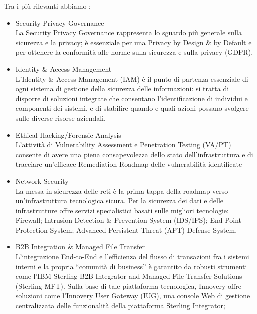 Tra i più rilevanti abbiamo : \begin{itemize}
    \item Security Privacy Governance \\ 
La Security Privacy Governance rappresenta lo sguardo più generale sulla sicurezza e la
privacy; è essenziale per una Privacy by Design \& by Default e per ottenere la conformità
alle norme sulla sicurezza e sulla privacy (GDPR).
    
    \item Identity \& Access Management \\ 
L’Identity \& Access Management (IAM) è il punto di partenza essenziale di ogni sistema
di gestione della sicurezza delle informazioni: si tratta di disporre di soluzioni integrate
che consentano l’identificazione di individui e componenti dei sistemi, e di stabilire
quando e quali azioni possano svolgere sulle diverse risorse aziendali.

    \item Ethical Hacking/Forensic Analysis \\
L’attività di Vulnerability Assessment e Penetration Testing (VA/PT) consente di
avere una piena consapevolezza dello stato dell’infrastruttura e di tracciare un’efficace
Remediation Roadmap delle vulnerabilità identificate

    \item Network Security \\
La messa in sicurezza delle reti è la prima tappa della roadmap verso un’infrastruttura tecnologica sicura. Per la sicurezza dei dati e delle infrastrutture offre servizi specialistici basati sulle migliori tecnologie: Firewall; Intrusion Detection \& Prevention System (IDS/IPS); End Point Protection System; Advanced Persistent Threat (APT) Defense System.

    \item B2B Integration \& Managed File Transfer \\
L’integrazione End-to-End e l’efficienza del flusso di transazioni fra i sistemi interni e la
propria “comunità di business” è garantito da robusti strumenti come l’IBM Sterling B2B Integrator and Managed File Transfer Solutions (Sterling MFT). Sulla base di tale piattaforma
tecnologica, Innovery offre soluzioni come l’Innovery User Gateway (IUG), una
console Web di gestione centralizzata delle funzionalità della piattaforma Sterling Integrator;
\end{itemize}

\clearpage

